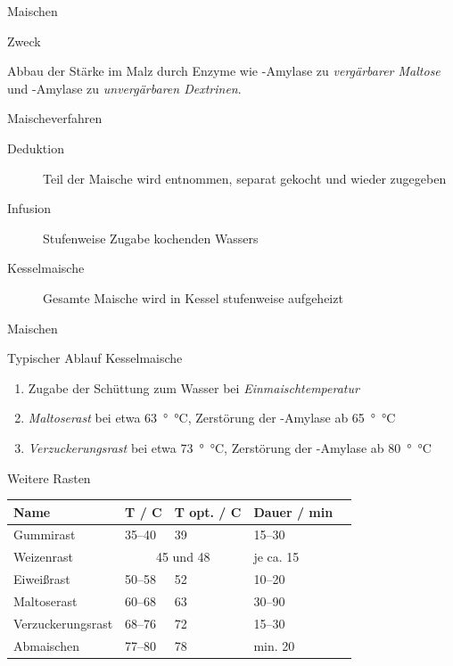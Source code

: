 \documentclass[9pt, ngerman]{beamer}
\begin{document}
\begin{frame}{Maischen}
  \begin{block}{Zweck}
    \vspace{0.5em}

    Abbau der Stärke im Malz durch Enzyme wie \textbeta-Amylase zu
    \emph{vergärbarer Maltose} und \textalpha-Amylase zu \emph{unvergärbaren
    Dextrinen}.

  \end{block}
  
  \begin{block}{Maischeverfahren}
  	\begin{description}
  		\item[Deduktion] Teil der Maische wird entnommen, separat gekocht und wieder zugegeben
  		\item[Infusion] Stufenweise Zugabe kochenden Wassers
  		\item[Kesselmaische] Gesamte Maische wird in Kessel stufenweise aufgeheizt
  	\end{description}
  \end{block}
\end{frame}
\begin{frame}{Maischen}
  \begin{block}{Typischer Ablauf Kesselmaische}
    \begin{enumerate}
      \item Zugabe der Schüttung zum Wasser bei \emph{Einmaischtemperatur}
      \item \emph{Maltoserast} bei etwa \SI{63}{\degree\celsius}, Zerstörung der
        \textbeta-Amylase ab \SI{65}{\degree\celsius}
      \item \emph{Verzuckerungsrast} bei etwa \SI{73}{\degree\celsius},
        Zerstörung der \textalpha-Amylase ab \SI{80}{\degree\celsius}
    \end{enumerate}
  \end{block}
  \begin{block}{Weitere Rasten}
    \vspace{-0.5em}
  	\begin{table}
  		\begin{tabular}{lllll}
  			\textbf{Name} & \textbf{T / \textdegree C} &\textbf{ T opt. / \textdegree C} & \textbf{Dauer /  min}\\
  			\midrule
  			Gummirast & 35--40 & 39 & 15--30\\
  			Weizenrast & \multicolumn{2}{c}{45 und 48} & je ca. 15\\
  			Eiweißrast & 50--58 & 52 & 10--20\\
  			Maltoserast & 60--68 & 63 & 30--90\\
  			Verzuckerungsrast & 68--76 & 72 & 15--30\\
  			Abmaischen & 77--80 & 78 & min. 20\\
  		\end{tabular}
  	\end{table}
  \end{block}
  
  
\end{frame}
\end{document}
